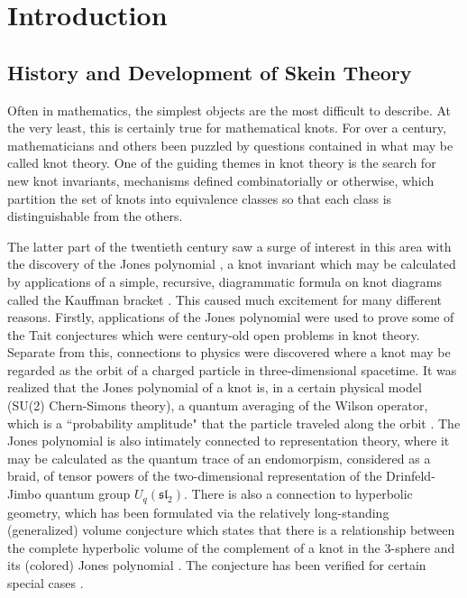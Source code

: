 \chapter{Introduction}

\section{History and Development of Skein Theory}

Often in mathematics, the simplest objects are the most difficult to describe. At the very least, this is certainly true for mathematical knots. For over a century, mathematicians and others been puzzled by questions contained in what may be called knot theory. One of the guiding themes in knot theory is the search for new knot invariants, mechanisms defined combinatorially or otherwise, which partition the set of knots into equivalence classes so that each class is distinguishable from the others. 

The latter part of the twentieth century saw a surge of interest in this area with the discovery of the Jones polynomial \cite{Jon85}, a knot invariant which may be calculated by applications of a simple, recursive, diagrammatic formula on knot diagrams called the Kauffman bracket \cite{Kau87}. This caused much excitement for many different reasons. Firstly, applications of the Jones polynomial were used to prove some of the Tait conjectures \cite{Kau87, Thi88} which were century-old open problems in knot theory. Separate from this, connections to physics were discovered where a knot may be regarded as the orbit of a charged particle in three-dimensional spacetime. It was realized that the Jones polynomial of a knot is, in a certain physical model (SU(2) Chern-Simons theory), a quantum averaging of the Wilson operator, which is a ``probability amplitude" that the particle traveled along the orbit \cite{Wit89}. The Jones polynomial is also intimately connected to representation theory, where it may be calculated as the quantum trace of an endomorpism, considered as a braid, of tensor powers of the two-dimensional representation of the Drinfeld-Jimbo quantum group $U_q(\mathfrak{sl}_2)$. There is also a connection to hyperbolic geometry, which has been formulated via the relatively long-standing (generalized) volume conjecture which states that there is a relationship between the complete hyperbolic volume of the complement of a knot in the $3$-sphere and its (colored) Jones polynomial \cite{Hik07}. The conjecture has been verified for certain special cases \cite{KT00}. 

